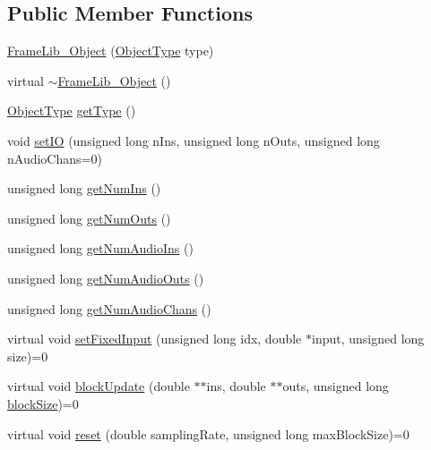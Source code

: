\subsection*{Public Member Functions}
\begin{DoxyCompactItemize}
\item 
\hyperlink{class_frame_lib___object_a81d840729ed8fc0e86ec33969a5a5a85}{Frame\+Lib\+\_\+\+Object} (\hyperlink{_frame_lib___types_8h_a842c5e2e69277690b064bf363c017980}{Object\+Type} type)
\item 
virtual \hyperlink{class_frame_lib___object_ab88bcc3fe9e1c9da41a4afebb3d05005}{$\sim$\+Frame\+Lib\+\_\+\+Object} ()
\item 
\hyperlink{_frame_lib___types_8h_a842c5e2e69277690b064bf363c017980}{Object\+Type} \hyperlink{class_frame_lib___object_a8e535510b8445958f5f5a95ecb11a588}{get\+Type} ()
\item 
void \hyperlink{class_frame_lib___object_a5c34227ace795af7da847fff3f2b300d}{set\+IO} (unsigned long n\+Ins, unsigned long n\+Outs, unsigned long n\+Audio\+Chans=0)
\item 
unsigned long \hyperlink{class_frame_lib___object_ad9ab064d9390417fde0644ed413e1c5c}{get\+Num\+Ins} ()
\item 
unsigned long \hyperlink{class_frame_lib___object_a6be2c4c3faf10ce732347b2e59f51508}{get\+Num\+Outs} ()
\item 
unsigned long \hyperlink{class_frame_lib___object_aa57fd96d292e25d91f107c6bec292ed0}{get\+Num\+Audio\+Ins} ()
\item 
unsigned long \hyperlink{class_frame_lib___object_a8304968cf5473f22804d46950d88256a}{get\+Num\+Audio\+Outs} ()
\item 
unsigned long \hyperlink{class_frame_lib___object_ae3b9c6438cc170618c221fc96612d19b}{get\+Num\+Audio\+Chans} ()
\item 
virtual void \hyperlink{class_frame_lib___object_a0d3bed42a21ebf248366f4457722beff}{set\+Fixed\+Input} (unsigned long idx, double $\ast$input, unsigned long size)=0
\item 
virtual void \hyperlink{class_frame_lib___object_a6efd81ab386e62400960471fa3cc94e7}{block\+Update} (double $\ast$$\ast$ins, double $\ast$$\ast$outs, unsigned long \hyperlink{_frame_lib___memory_8cpp_a8ef7d53a4cac28bf580a61f265fcaaa6}{block\+Size})=0
\item 
virtual void \hyperlink{class_frame_lib___object_aeb02311ab422dd569aeb982e31a66893}{reset} (double sampling\+Rate, unsigned long max\+Block\+Size)=0
\item 

\end{DoxyCompactItemize}
